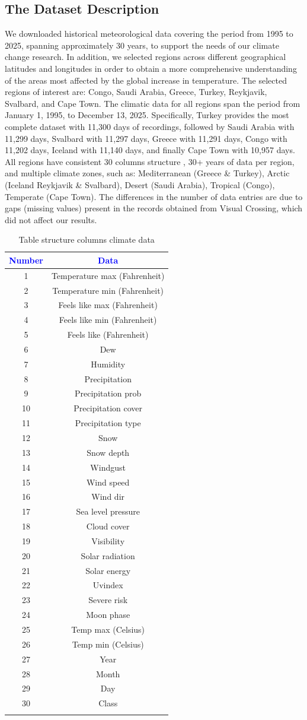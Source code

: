 \documentclass[12pt]{Definitions/academia}
\begin{document}
\subsection{\textmd{The Dataset Description}}
\vspace{-4em}
We downloaded historical meteorological data covering the period from
1995 to 2025, spanning approximately 30 years, to support the needs
of our climate change research. In addition, we selected regions across
different geographical latitudes and longitudes in order to obtain
a more comprehensive understanding of the areas most affected by the
global increase in temperature. The selected regions of interest are:
Congo, Saudi Arabia, Greece, Turkey, Reykjavik, Svalbard, and Cape
Town. The climatic data for all regions span the period from January
1, 1995, to December 13, 2025. Specifically, Turkey provides the most
complete dataset with 11,300 days of recordings, followed by Saudi
Arabia with 11,299 days, Svalbard with 11,297 days, Greece with 11,291
days, Congo with 11,202 days, Iceland with 11,140 days, and finally
Cape Town with 10,957 days. All regions have consistent 30 columns
structure , 30+ years of data per
region, and multiple climate zones, such as: Mediterranean (Greece
\& Turkey), Arctic (Iceland Reykjavik \& Svalbard), Desert (Saudi
Arabia), Tropical (Congo), Temperate (Cape Town). The differences
in the number of data entries are due to gaps (missing values) present
in the records obtained from Visual Crossing, which did not affect
our results.

\begin{table}[H]
	\centering
\begin{tabular*}{10cm}{@{\extracolsep{\fill}}|c|c|}
\hline
\textbf{\textcolor{blue}{Number}} & \textbf{\textcolor{blue}{Data}}\tabularnewline
\hline
\hline
1 & Temperature max (Fahrenheit)\tabularnewline
\hline
2 & Temperature min (Fahrenheit)\tabularnewline
\hline
3 & Feels like max (Fahrenheit)\tabularnewline
\hline
4 & Feels like min (Fahrenheit)\tabularnewline
\hline
5 & Feels like (Fahrenheit)\tabularnewline
\hline
6 & Dew\tabularnewline
\hline
7 & Humidity\tabularnewline
\hline
8 & Precipitation\tabularnewline
\hline
9 & Precipitation prob\tabularnewline
\hline
10 & Precipitation cover\tabularnewline
\hline
11 & Precipitation type \tabularnewline
\hline
12 & Snow\tabularnewline
\hline
13 & Snow depth\tabularnewline
\hline
14 & Windgust\tabularnewline
\hline
15 & Wind speed\tabularnewline
\hline
16 & Wind dir\tabularnewline
\hline
17 & Sea level pressure\tabularnewline
\hline
18 & Cloud cover\tabularnewline
\hline
19 & Visibility\tabularnewline
\hline
20 & Solar radiation\tabularnewline
\hline
21 & Solar energy\tabularnewline
\hline
22 & Uvindex\tabularnewline
\hline
23 & Severe risk\tabularnewline
\hline
24 & Moon phase\tabularnewline
\hline
25 & Temp max (Celsius)\tabularnewline
\hline
26 & Temp min (Celsius)\tabularnewline
\hline
27 & Year\tabularnewline
\hline
28 & Month\tabularnewline
\hline
29 & Day\tabularnewline
\hline
30 & Class\tabularnewline
\hline
 & \tabularnewline
\hline
\end{tabular*}\caption{Table structure columns climate data\label{tab:Table-2-structure-columns}}
\end{table}
\end{document}

